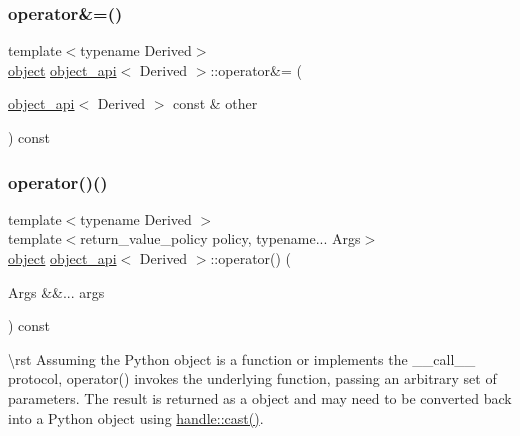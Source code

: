 \mbox{\label{classobject__api_ac5a561b5ef0c8518d5c1f0e98185fb3e}} 
\subsubsection{\texorpdfstring{operator\&=()}{operator\&=()}}
{\footnotesize\ttfamily template$<$typename Derived$>$ \\
\mbox{\hyperlink{classobject}{object}} \mbox{\hyperlink{classobject__api}{object\+\_\+api}}$<$ Derived $>$\+::operator\&= (\begin{DoxyParamCaption}\item[{\mbox{\hyperlink{classobject__api}{object\+\_\+api}}$<$ Derived $>$ const \&}]{other }\end{DoxyParamCaption}) const}

\mbox{\label{classobject__api_abe9df612ead8f4239dc32154d68e0cc1}} 
\subsubsection{\texorpdfstring{operator()()}{operator()()}}
{\footnotesize\ttfamily template$<$typename Derived $>$ \\
template$<$return\+\_\+value\+\_\+policy policy, typename... Args$>$ \\
\mbox{\hyperlink{classobject}{object}} \mbox{\hyperlink{classobject__api}{object\+\_\+api}}$<$ Derived $>$\+::operator() (\begin{DoxyParamCaption}\item[{Args \&\&...}]{args }\end{DoxyParamCaption}) const}

\textbackslash{}rst Assuming the Python object is a function or implements the {\ttfamily \+\_\+\+\_\+call\+\_\+\+\_\+} protocol, {\ttfamily operator()} invokes the underlying function, passing an arbitrary set of parameters. The result is returned as a {\ttfamily object} and may need to be converted back into a Python object using {\ttfamily \mbox{\hyperlink{classhandle_a8158ff37b59a73d48140ab4d718316b9}{handle\+::cast()}}}.

